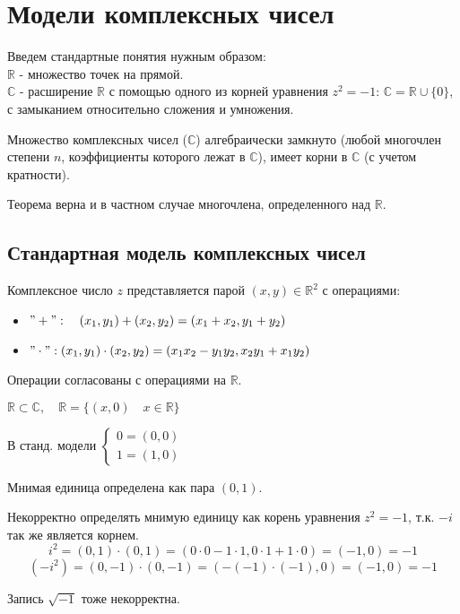 \section{Модели комплексных чисел}

\par 
Введем стандартные понятия нужным образом:\\
$\mathbb{R}$ - множество точек на прямой. \\
$\mathbb{C}$ - расширение $\mathbb{R}$ с помощью одного из корней уравнения $z^2 = -1$: $\mathbb{C} = \mathbb{R} \cup  \{0\}$, с замыканием относительно сложения и умножения.

\begin{theorem}
    Множество комплексных чисел ($\mathbb{C}$) алгебраически замкнуто 
    (любой многочлен степени $n$, коэффициенты которого лежат в $\mathbb{C}$),
     имеет корни в $\mathbb{C}$ (с учетом кратности).
\end{theorem}

\begin{note}
    Теорема верна и в частном случае многочлена, определенного над $\mathbb{R}$.
\end{note}

\medskip
\subsection{Стандартная модель комплексных чисел}

Комплексное число $z$ представляется парой $(x, y) \in \mathbb{R}^2$ с операциями:
\begin{itemize}
    \item $"+": \quad (x_1, y_1) + (x_2, y_2) = (x_1+x_2, y_1 + y_2)$
    \item $"\cdot": (x_1, y_1) \cdot (x_2, y_2) = (x_1x_2-y_1y_2, x_2y_1+x_1y_2)$
\end{itemize}

\begin{note}
    Операции согласованы с операциями на $\mathbb{R}.$
\end{note}
\begin{note}
    $\mathbb{R} \subset \mathbb{C}, \quad \mathbb{R} = \{(x, 0) \quad x \in \mathbb{R}\}$
\end{note}
В станд. модели 
$\begin{cases}
    0 = (0, 0)\\
    1 = (1, 0)
\end{cases}$

\begin{definition}
    Мнимая единица определена как пара $(0, 1)$.
\end{definition}
\begin{note}
    Некорректно определять мнимую единицу как корень уравнения $z^2 = -1$, т.к. $-i$ так же является корнем.
    \[i^2 = (0, 1) \cdot (0,1) = (0\cdot0 - 1\cdot1, 0\cdot1 + 1\cdot0) = (-1, 0) = -1\]
    \[(-i^2) = (0, -1)\cdot(0, -1) = (-(-1)\cdot(-1), 0) = (-1, 0) = -1\]
\end{note}
\begin{note}
    Запись $\sqrt{-1}$ тоже некорректна.
\end{note}

